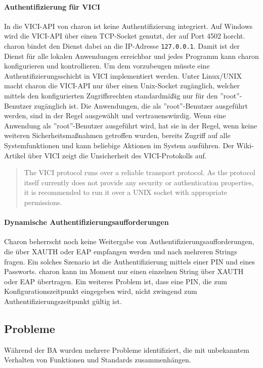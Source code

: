 \paragraph{Authentifizierung für VICI}
In die \ac{VICI}-\ac{API} von charon ist keine Authentifizierung integriert.
Auf Windows wird die \ac{VICI}-\ac{API} über einen TCP-Socket genutzt, der auf Port 4502
horcht. charon bindet den Dienst dabei an die \ac{IP}-Adresse \texttt{127.0.0.1}.
Damit ist der Dienst für alle lokalen Anwendungen erreichbar und jedes Programm
kann charon konfigurieren und kontrollieren.
Um dem vorzubeugen müsste eine Authentifizierungsschicht in \ac{VICI} implementiert werden.
Unter Linux/UNIX macht charon die \ac{VICI}-\ac{API} nur über einen Unix-Socket
zugänglich, welcher mittels den konfigurierten Zugriffsrechten standardmäßig
nur für den ''root''-Benutzer zugänglich ist. Die Anwendungen, die als ''root''-Benutzer
ausgeführt werden, sind in der Regel ausgewählt und vertrauenswürdig.  Wenn eine Anwendung
als ''root''-Benutzer ausgeführt wird, hat sie in der Regel, wenn keine weiteren Sicherheitsmaßnahmen getroffen
wurden, bereits Zugriff auf alle Systemfunktionen und kann beliebige Aktionen im System ausführen.
Der Wiki-Artikel über \ac{VICI} zeigt die Unsicherheit des \ac{VICI}-Protokolls auf.
\begin{quote}
The VICI protocol runs over a reliable transport protocol. As the protocol itself currently does not provide any security or authentication properties, it is recommended to run it over a UNIX socket with appropriate permissions.
\end{quote}\cite[][]{_vici_2016}
\paragraph{Dynamische Authentifizierungsaufforderungen}
Charon beherrscht noch keine Weitergabe von Authentifizierungsaufforderungen,
die über XAUTH oder EAP empfangen werden und nach mehreren Strings fragen.
Ein solches Szenario ist die Authentifizierung mittels einer PIN und eines Passworts.
charon kann im Moment nur einen einzelnen String über XAUTH oder EAP übertragen.
Ein weiteres Problem ist, dass eine PIN, die zum Konfigurationszeitpunkt
eingegeben wird, nicht zwingend zum Authentifizierungszeitpunkt gültig ist.

\subsection{Probleme}
Während der \ac{BA} wurden mehrere Probleme identifiziert, die mit unbekanntem
Verhalten von Funktionen und Standards zusammenhängen.
